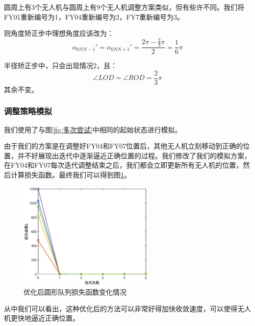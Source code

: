 \documentclass[12pt,AutoFakeSlant,AutoFakeBold]{article}
\begin{document}
圆周上有3个无人机与圆周上有9个无人机调整方案类似，但有些许不同。我们将FY01重新编号为1，FY04重新编号为2，FY7重新编号为3。

则角度矫正步中理想角度应该改为：
\begin{equation}
    \alpha_{0NN-1}' = \alpha_{0NN+1}' = \frac{2\pi - \frac{2}{3}\pi}{2} = \frac{1}{6}\pi
\end{equation}

半径矫正步中，只会出现情况2，且：
\begin{equation}
    \angle LOD = \angle ROD = \frac{2}{3}\pi
\end{equation}
其余不变。

\subsubsection{调整策略模拟}

我们使用了与图\ref{fig:多次尝试}中相同的起始状态进行模拟。

由于我们的方案是在调整好FY04和FY07位置后，其他无人机立刻移动到正确的位置，并不好展现出迭代中逐渐逼近正确位置的过程。我们修改了我们的模拟方案，在FY04和FY07每次迭代调整结束之后，我们都会立即更新所有无人机的位置，然后计算损失函数。最终我们可以得到图\ref{fig:多次尝试_优化}。

\begin{figure}[!ht]
    \centering
    \includegraphics[width=0.6\textwidth]{图片/多次尝试_优化.eps}
    \caption{优化后圆形队列损失函数变化情况}
    \label{fig:多次尝试_优化}
\end{figure}

从中我们可以看出，这种优化后的方法可以非常好得加快收敛速度，可以使得无人机更快地逼近正确位置。

\end{document}
